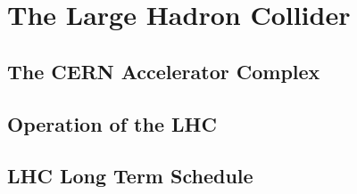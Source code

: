 \chapter{The Large Hadron Collider}

\section{The CERN Accelerator Complex}

\section{Operation of the LHC}

\section{LHC Long Term Schedule}